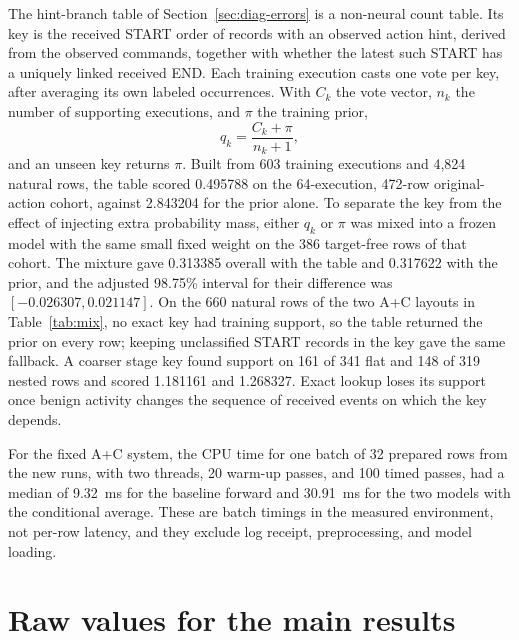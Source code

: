 The hint-branch table of Section~\ref{sec:diag-errors} is a non-neural
count table. Its key is the received
START order of records with an observed action hint, derived from the
observed commands, together with whether the latest such START has a
uniquely linked received END. Each training execution casts one vote per
key, after averaging its own labeled occurrences. With $C_k$ the vote
vector, $n_k$ the number of supporting executions, and $\pi$ the
training prior,
\begin{equation}
  q_k = \frac{C_k+\pi}{n_k+1},
  \label{eq:table}
\end{equation}
and an unseen key returns $\pi$. Built from 603 training executions and
4,824 natural rows, the table scored 0.495788 on the 64-execution,
472-row original-action cohort, against 2.843204 for the prior alone.
To separate the key from the effect of injecting extra probability
mass, either $q_k$ or $\pi$ was mixed into a frozen model with the same
small fixed weight on the 386 target-free rows of that cohort. The
mixture gave 0.313385 overall with the table and 0.317622 with the
prior, and the adjusted 98.75\% interval for their difference was
$[-0.026307,0.021147]$. On the 660 natural rows of the two A+C layouts
in Table~\ref{tab:mix}, no exact key had training support, so the
table returned the prior on every row; keeping unclassified START
records in the key gave the same fallback. A coarser stage key found
support on 161 of 341 flat and 148 of 319 nested rows and scored
1.181161 and 1.268327. Exact lookup loses its support once benign
activity changes the sequence of received events on which the key
depends.

For the fixed A+C system, the CPU time for one batch of 32 prepared rows
from the new runs, with two threads, 20 warm-up passes, and 100 timed
passes, had a median of 9.32~ms for the baseline forward and 30.91~ms
for the two models with the conditional average. These are batch
timings in the measured environment, not per-row latency, and they
exclude log receipt, preprocessing, and model loading.

\section{Raw values for the main results}
\label{sec:app-raw}

